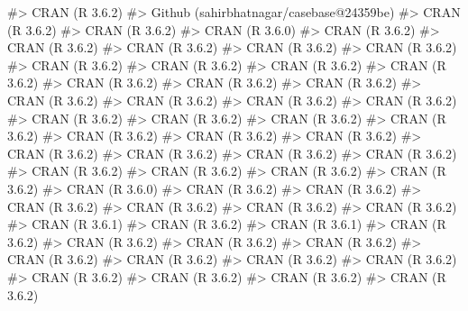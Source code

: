 \documentclass[
]{jss}
\begin{document}
\begin{CodeChunk}
\begin{CodeOutput}
#>  CRAN (R 3.6.2)                          
#>  Github (sahirbhatnagar/casebase@24359be)
#>  CRAN (R 3.6.2)                          
#>  CRAN (R 3.6.2)                          
#>  CRAN (R 3.6.0)                          
#>  CRAN (R 3.6.2)                          
#>  CRAN (R 3.6.2)                          
#>  CRAN (R 3.6.2)                          
#>  CRAN (R 3.6.2)                          
#>  CRAN (R 3.6.2)                          
#>  CRAN (R 3.6.2)                          
#>  CRAN (R 3.6.2)                          
#>  CRAN (R 3.6.2)                          
#>  CRAN (R 3.6.2)                          
#>  CRAN (R 3.6.2)                          
#>  CRAN (R 3.6.2)                          
#>  CRAN (R 3.6.2)                          
#>  CRAN (R 3.6.2)                          
#>  CRAN (R 3.6.2)                          
#>  CRAN (R 3.6.2)                          
#>  CRAN (R 3.6.2)                          
#>  CRAN (R 3.6.2)                          
#>  CRAN (R 3.6.2)                          
#>  CRAN (R 3.6.2)                          
#>  CRAN (R 3.6.2)                          
#>  CRAN (R 3.6.2)                          
#>  CRAN (R 3.6.2)                          
#>  CRAN (R 3.6.2)                          
#>  CRAN (R 3.6.2)                          
#>  CRAN (R 3.6.2)                          
#>  CRAN (R 3.6.2)                          
#>  CRAN (R 3.6.2)                          
#>  CRAN (R 3.6.2)                          
#>  CRAN (R 3.6.2)                          
#>  CRAN (R 3.6.2)                          
#>  CRAN (R 3.6.2)                          
#>  CRAN (R 3.6.0)                          
#>  CRAN (R 3.6.2)                          
#>  CRAN (R 3.6.2)                          
#>  CRAN (R 3.6.2)                          
#>  CRAN (R 3.6.2)                          
#>  CRAN (R 3.6.2)                          
#>  CRAN (R 3.6.2)                          
#>  CRAN (R 3.6.1)                          
#>  CRAN (R 3.6.2)                          
#>  CRAN (R 3.6.1)                          
#>  CRAN (R 3.6.2)                          
#>  CRAN (R 3.6.2)                          
#>  CRAN (R 3.6.2)                          
#>  CRAN (R 3.6.2)                          
#>  CRAN (R 3.6.2)                          
#>  CRAN (R 3.6.2)                          
#>  CRAN (R 3.6.2)                          
#>  CRAN (R 3.6.2)                          
#>  CRAN (R 3.6.2)                          
#>  CRAN (R 3.6.2)                          
#>  CRAN (R 3.6.2)                          
#>  CRAN (R 3.6.2)                          

\end{CodeOutput}
\end{CodeChunk}
\end{document}
